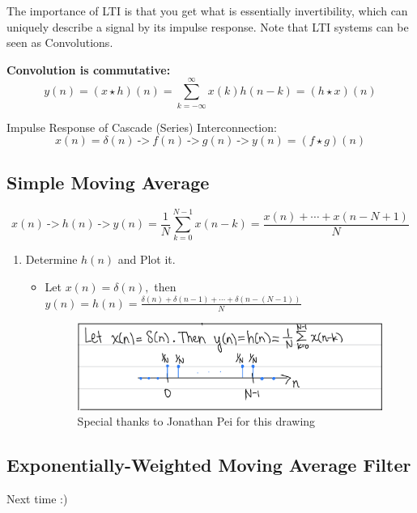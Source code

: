 \begin{itemize}
    The importance of LTI is that you get what is essentially invertibility, which can uniquely describe a signal by its impulse response. Note that LTI systems can be seen as Convolutions.
    
    \textbf{Convolution is commutative:}
    \[
        y(n) = (x\star h)(n)=\sum_{k=-\infty}^\infty x(k)h(n-k)
        = (h\star x)(n)
    \]
    
    Impulse Response of Cascade (Series) Interconnection:
    \[
        x(n)=\delta(n) \ \texttt{->} \ \boxed{f(n)} \ \texttt{->} \ \boxed{g(n)} \ \texttt{->} \  y(n)=(f\star g)(n)
    \]
\end{itemize}


\subsection{Simple Moving Average}
\[
    x(n) \ \texttt{->} \ \boxed{h(n)} \ \texttt{->} \  y(n)=\frac1N\sum_{k=0}^{N-1} x(n-k)=\frac{x(n)+\cdots+x(n-N+1)}{N}
\]

\begin{enumerate}[label=(\alph*)]
    \item Determine $h(n)$ and Plot it.
    \begin{itemize}
        \item Let $x(n)=\delta(n),$ then $y(n)=h(n)=\frac{\delta(n)+\delta(n-1)+\cdots+\delta(n-(N-1))}{N}$
    
        \begin{figure}[h]
            \centering
            \includegraphics[scale=0.25]{lectures/img/Lec2_SimpleMovingAverage.png}
            \caption{Special thanks to Jonathan Pei for this drawing}
            \label{fig:simple_moving_average}
        \end{figure}
    \end{itemize}
\end{enumerate}

\subsection{Exponentially-Weighted Moving Average Filter}
Next time :)
